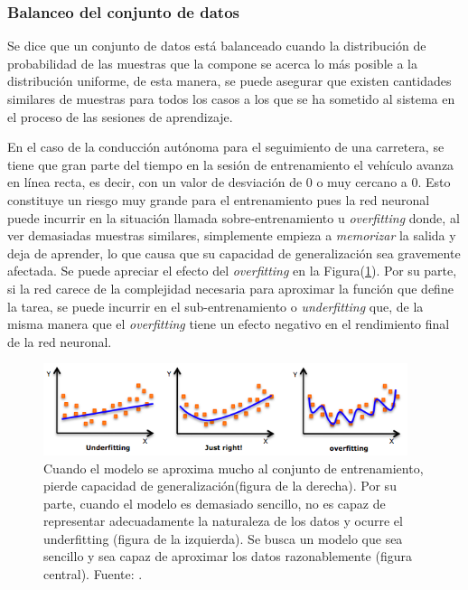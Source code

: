         \subsubsection{Balanceo del conjunto de datos}
        Se dice que un conjunto de datos está balanceado cuando la distribución de probabilidad de las muestras que la compone 
        se acerca lo más posible a la distribución uniforme, de esta manera, se puede asegurar que existen cantidades similares 
        de muestras para todos los casos a los que se ha sometido al sistema en el proceso de las sesiones de aprendizaje. 

        En el caso de la conducción autónoma para el seguimiento de una carretera, se tiene que gran parte del tiempo en la 
        sesión de entrenamiento el vehículo avanza en línea recta, es decir, con un valor de desviación de 0 o muy cercano a 0.
        Esto constituye un riesgo muy grande para el entrenamiento pues la red neuronal puede incurrir en la situación llamada 
        sobre-entrenamiento u \textit{overfitting} donde, al ver demasiadas muestras similares, simplemente empieza a \textit{memorizar}
        la salida y deja de aprender, lo que causa que su capacidad de generalización sea gravemente afectada. Se puede apreciar el 
        efecto del \textit{overfitting} en la Figura(\ref{fig:overfitting}). Por su parte, si la red carece de la complejidad necesaria para aproximar 
        la función que define la tarea, se puede incurrir en el sub-entrenamiento o \textit{underfitting} que, de la misma manera 
        que el \textit{overfitting} tiene un efecto negativo en el rendimiento final de la red neuronal.

        \begin{figure}[!h] 
            \centering
            \includegraphics[width=0.95\textwidth]{img/overfitting}
            \caption[Overfitting en modelos de aprendizaje]{Cuando el modelo se aproxima mucho al conjunto de entrenamiento, pierde capacidad 
            de generalización(figura de la derecha). Por su parte, cuando el modelo es demasiado sencillo, no es capaz de representar 
            adecuadamente la naturaleza de los datos y ocurre el underfitting (figura de la izquierda). Se busca un modelo 
            que sea sencillo y sea capaz de aproximar los datos razonablemente (figura central). Fuente: \cite{rayon}. }
            \label{fig:overfitting}
        \end{figure}

